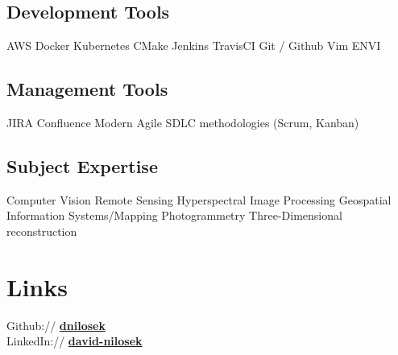 \documentclass[]{nilosek-resume}
\begin{document}
\begin{minipage}[t]{0.25\textwidth}
\subsection{Development Tools}
AWS \textbullet{} Docker \textbullet{} Kubernetes \textbullet{} CMake \textbullet{} Jenkins \textbullet{} TravisCI \textbullet{} Git / Github \textbullet{} Vim \textbullet{} ENVI \\
\sectionsep
\subsection{Management Tools}
JIRA \textbullet{} Confluence \textbullet{} Modern Agile SDLC methodologies (Scrum, Kanban)\\
\sectionsep
\subsection{Subject Expertise}
Computer Vision \textbullet{} Remote Sensing \textbullet{} Hyperspectral Image Processing \textbullet{} Geospatial Information Systems/Mapping \textbullet{} Photogrammetry \textbullet{} Three-Dimensional reconstruction

\section{Links} 
Github:// \href{https://github.com/dnilosek}{\bf dnilosek} \\
LinkedIn://  \href{https://www.linkedin.com/in/david-nilosek-aab5a696}{\bf david-nilosek} \\



%
%

\end{minipage} 
\hfill
\end{document}

